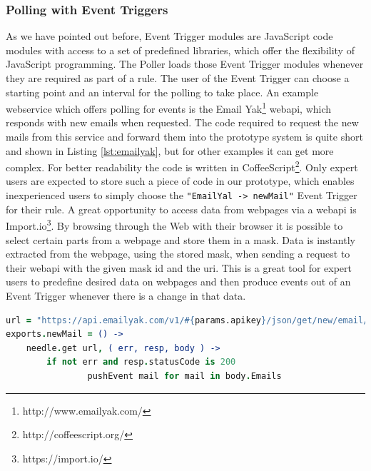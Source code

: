\subsubsection{Polling with Event Triggers}
As we have pointed out before, \textrm{Event Trigger} modules are \textrm{JavaScript} code modules with access to a set of predefined libraries, which offer the flexibility of \textrm{JavaScript} programming.
The \textrm{Poller} loads those \textrm{Event Trigger} modules whenever they are required as part of a rule.
The user of the \textrm{Event Trigger} can choose a starting point and an interval for the polling to take place.
An example \textrm{\gls{webservice}} which offers polling for events is the \textrm{Email Yak}\footnote{http://www.emailyak.com/} \textrm{\gls{webapi}}, which responds with new emails when requested.
The code required to request the new mails from this service and forward them into the prototype system is quite short and shown in Listing \ref{lst:emailyak}, but for other examples it can get more complex.
For better readability the code is written in \textrm{CoffeeScript}\footnote{http://coffeescript.org/}.
Only expert users are expected to store such a piece of code in our prototype, which enables inexperienced users to simply choose the \texttt{"EmailYal -> newMail"} \textrm{Event Trigger} for their rule.  
A great opportunity to access data from webpages via a \textrm{\gls{webapi}} is \textrm{Import.io}\footnote{https://import.io/}.
By browsing through the Web with their browser it is possible to select certain parts from a webpage and store them in a mask.
Data is instantly extracted from the webpage, using the stored mask, when sending a request to their \textrm{\gls{webapi}} with the given mask id and the \textrm{\acrshort{uri}}.
This is a great tool for expert users to predefine desired data on webpages and then produce events out of an \textrm{Event Trigger} whenever there is a change in that data.
\begin{lstlisting}[float=h,label=lst:emailyak,language=CoffeeScript,caption=Event Trigger code to poll Email Yak RESTful Web service for new Mails; written in CoffeeScript]
url = "https://api.emailyak.com/v1/#{params.apikey}/json/get/new/email/"
exports.newMail = () ->
	needle.get url, ( err, resp, body ) ->
		if not err and resp.statusCode is 200
				pushEvent mail for mail in body.Emails
\end{lstlisting}



